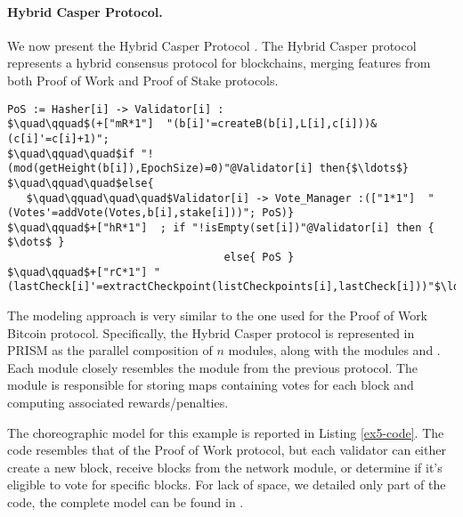 \paragraph{Hybrid Casper Protocol.}
\begin{comment}
\begin{wrapfigure}[12]{l}{4.5cm}
	\texttt{[image: ethereum.pdf]}	
\end{wrapfigure} 
\end{comment}
We now present the Hybrid Casper Protocol \cite{DBLP:journals/distribledger/GallettaLMV23}. The Hybrid Casper protocol represents a hybrid consensus protocol for blockchains, merging features from both Proof of Work and Proof of Stake protocols. 
\begin{lstlisting}[style=chor-color,tabsize=2,breaklines=true, postbreak=\mbox{\textcolor{red}{$\hookrightarrow$}\space},	caption={Excerpt of choreography for the Hybrid Casper Protocol},captionpos=b,label={ex5-code}]
PoS := Hasher[i] -> Validator[i] :
$\quad\qquad$(+["mR*1"]  "(b[i]'=createB(b[i],L[i],c[i]))&(c[i]'=c[i]+1)"; 
$\quad\qquad\quad$if "!(mod(getHeight(b[i]),EpochSize)=0)"@Validator[i] then{$\ldots$}
$\quad\qquad\quad$else{
   $\quad\qquad\quad\quad$Validator[i] -> Vote_Manager :(["1*1"]  "(Votes'=addVote(Votes,b[i],stake[i]))"; PoS)}
$\quad\qquad$+["hR*1"]  ; if "!isEmpty(set[i])"@Validator[i] then { $\dots$ }
 							      else{ PoS }
$\quad\qquad$+["rC*1"] "(lastCheck[i]'=extractCheckpoint(listCheckpoints[i],lastCheck[i]))"$\ldots$
\end{lstlisting}
The modeling approach is very similar to the one used for the Proof of Work Bitcoin protocol. Specifically, the Hybrid Casper protocol is represented in PRISM as the parallel composition of $n$  modules, along with the modules  and . Each  module closely resembles the  module from the previous protocol. The module  is responsible for storing maps containing votes for each block and computing associated rewards/penalties.

The choreographic model for this example is reported in Listing \ref{ex5-code}. 
The code resembles that of the Proof of Work protocol, but each validator can either create a new block, receive blocks from the network module, or determine if it's eligible to vote for specific blocks.
For lack of space, we detailed only part of the code, the complete model can be found in \cite{repository}.


